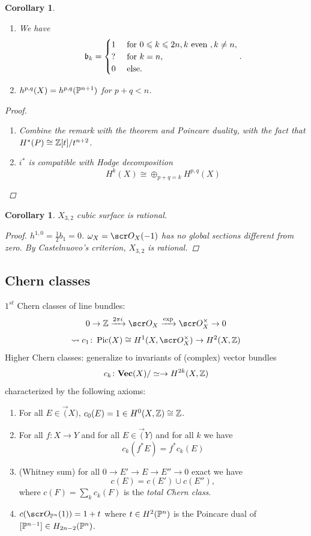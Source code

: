 \documentclass[A4paper, british, reqno]{amsart}
\theoremstyle{darkgreentheorem}
\newtheorem{cor}[thm]{Corollary}
\theoremstyle{darkbluedefinition}
\theoremstyle{darkredexample}
\theoremstyle{remark}
\DeclareMathOperator{\Pic}{Pic}
\newcommand{\1}{\mathbbm{1}}
\newcommand{\op}{\oplus}
\begin{document}
\begin{cor}
    \begin{enumerate}
	\item We have 
	    \[ \b_{k}=\begin{cases}
		1 & \text{ for } 0\leqslant k \leqslant 2n, k\text{ even },k\neq n, \\
		? & \text{ for } k=n, \\
		0 & \text{ else}.
	\end{cases}.
	    \]
	\item $h^{p,q}(X)=h^{p,q}(\P^{n+1})$ for $p+q<n$.
    \end{enumerate}
    \begin{proof}
	\begin{enumerate}
	    \item Combine the remark with the theorem and Poincare duality, with the fact that $H^{*}(P)\cong \Z[t]/t^{n+2}$.
	    \item $i^{*}$ is compatible with Hodge decomposition
		\[ H^{k}(X)\cong \op_{p+q=k}H^{p,q}(X) \]
	\end{enumerate}
    \end{proof}
\end{cor}

\begin{cor}
    $X_{3,2}$ cubic surface is rational.
    \begin{proof}
	$h^{1,0}=\frac{1}{2}b_{1}=0$.
	$\w_{X}=\O_{X}(-1)$ has no global sections different from zero.
	By Castelnuovo's criterion, $X_{3,2}$ is rational.
    \end{proof}
\end{cor}

\subsection{Chern classes}

$1^{st}$ Chern classes of line bundles:
\[ 0\to \Z\xrightarrow{2\pi i}\O_{X}\xrightarrow{\operatorname{exp}} \O_{X}^{\times} \to 0 \]
\[ \rightsquigarrow c_{1}\colon \Pic(X)\cong H^{1}(X,\O_{X}^{\times})\to H^{2}(X,\Z) \]
Higher Chern classes: generalize to invariants of (complex) vector bundles
\[ c_{k}\colon \Vec(X)/\simeq \to H^{2k}(X,\Z) \]
characterized by the following axioms:
\begin{enumerate}
    \item For all $E\in \Vec(X)$, $c_{0}(E)=1\in H^{0}(X,\Z)\cong \Z$.
    \item For all $f\colon X\to Y$ and for all $E\in \Vec(Y)$ and for all $k$ we have
	\[ c_{k}(f^{*}E)=f^{*}c_{k}(E) \]
    \item (Whitney sum) for all $0\to E'\to E\to E''\to 0$ exact we have
	\[ c(E)=c(E')\cup c(E''),\]
	where $c(F)=\sum_{k}c_{k}(F)$ is the \textit{total Chern class}.
    \item $c(\O_{\P^{n}}(1))=1+t$ where $t\in H^{2}(\P^{n})$ is the Poincare dual of $[\P^{n-1}]\in H_{2n-2}(\P^{n})$.
\end{enumerate}
\end{document}
